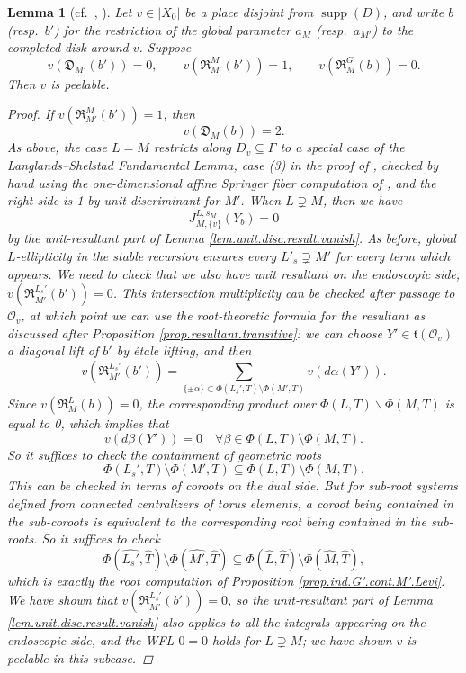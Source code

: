 \documentclass[openany]{amsbook}
\newtheorem{lemma}[theorem]{Lemma}
\theoremstyle{definition}
\theoremstyle{remark}
\numberwithin{equation}{section}
\renewcommand{\O}{\mathcal{O}}
\renewcommand{\-}{\operatorname{-}}
\newcommand{\on}[1]{\operatorname{#1}}
\newcommand{\ft}{\mathfrak{t}}
\newcommand{\fD}{\mathfrak{D}}
\newcommand{\fR}{\mathfrak{R}}
\begin{document}
\begin{lemma}[{cf.\ \cite[\S 8.3]{ngofl}, \cite[Lemme 17.7.2]{CLII}}]\label{lem.tranv.result.1}
    Let $v \in |X_0|$ be a place disjoint from $\on{supp}(D)$, and write $b$ (resp.\ $b'$) for the restriction of the global parameter $a_M$ (resp.\ $a_{M'}$) to the completed disk around $v$. Suppose
    \begin{equation}
        v(\fD_{M'}(b')) = 0, \qquad v(\fR_{M'}^M(b')) = 1, \qquad v(\fR_M^G(b)) = 0.\label{eqn.tranv.R}
    \end{equation}
    Then $v$ is peelable.
    \begin{proof}
        If $v(\fR_{M'}^M(b')) = 1$, then 
        $$
            v(\fD_M(b)) = 2.
        $$
        As above, the case $L = M$ restricts along $D_v \subseteq \Gamma$ to a special case of the Langlands--Shelstad Fundamental Lemma, case (3) in the proof of \cite[Lemme 8.5.7]{ngofl}, checked by hand using the one-dimensional affine Springer fiber computation of \cite[\S 8.3]{ngofl}, and the right side is 1 by unit-discriminant for $M'$. When $L \supsetneq M$, then we have
        $$
            J_{M,\{v\}}^{L, s_M}(Y_b) = 0
        $$
        by the unit-resultant part of Lemma \ref{lem.unit.disc.result.vanish}. As before, global $L$-ellipticity in the stable recursion ensures every $L'_s \supsetneq M'$ for every term which appears. We need to check that we also have unit resultant on the endoscopic side, $v(\fR_{M'}^{L_s'}(b')) = 0$. This intersection multiplicity can be checked after passage to $\O_v$, at which point we can use the root-theoretic formula for the resultant as discussed after Proposition \ref{prop.resultant.transitive}: we can choose $Y' \in \ft(\O_v)$ a \emph{diagonal} lift of $b'$ by \'etale lifting, and then
        $$
            v(\fR_{M'}^{L_s'}(b')) = \sum_{\{\pm \alpha\} \subset \Phi(L_s', T) \setminus \Phi(M', T)} v(d\alpha(Y')).
        $$
        Since $v(\fR_M^L(b)) = 0$, the corresponding product over $\Phi(L,T) \backslash \Phi(M, T)$ is equal to 0, which implies that $$
            v(d \beta(Y')) = 0 \quad \forall \beta \in \Phi(L,T) \setminus \Phi(M,T).
        $$
        So it suffices to check the containment of geometric roots
        $$
            \Phi(L_s', T) \setminus \Phi(M', T) \subseteq \Phi(L,T) \setminus \Phi(M,T).
        $$
        This can be checked in terms of coroots on the dual side. But for sub-root systems defined from connected centralizers of torus elements, a coroot being contained in the sub-coroots is equivalent to the corresponding root being contained in the sub-roots. So it suffices to check
        $$
            \Phi(\widehat{L_s'}, \widehat{T}) \setminus \Phi(\widehat{M'}, \widehat{T}) \subseteq \Phi(\widehat{L},\widehat{T}) \setminus \Phi(\widehat{M},\widehat{T}),
        $$
        which is exactly the root computation of Proposition \ref{prop.ind.G'.cont.M'.Levi}. We have shown that $v(\fR_{M'}^{L_s'}(b')) = 0$, so the unit-resultant part of Lemma \ref{lem.unit.disc.result.vanish} also applies to all the integrals appearing on the endoscopic side, and the WFL $0 = 0$ holds for $L \supsetneq M$; we have shown $v$ is peelable in this subcase.
\end{proof}
\end{lemma}
\end{document}
